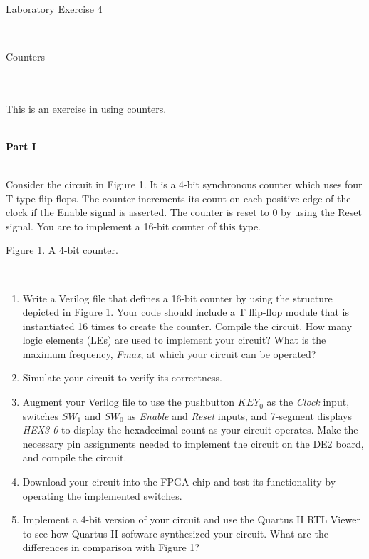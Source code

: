 \documentclass[psfig,10pt,fullpage]{article}
\begin{document}
~\\
\centerline{\huge Laboratory Exercise 4}
~\\
\centerline{\large Counters}
~\\
~\\

This is an exercise in using counters.

~\\
\noindent
{\bf Part I}

~\\
\noindent
Consider the circuit in Figure 1. It is a 4-bit synchronous counter which uses four
T-type flip-flops. The counter increments its count on each positive edge of the clock
if the Enable signal is asserted. The counter is reset to 0 by using the Reset signal.
You are to implement a 16-bit counter of this type.
~\\

\begin{figure}[H]
\scriptsize
\centerline{
\hbox{}}
\end{figure}
\centerline{Figure 1.  A 4-bit counter.}
~\\

\begin{enumerate}
\item Write a Verilog file that defines a 16-bit counter by using the structure
depicted in Figure 1. Your code should include a T flip-flop module that is instantiated
16 times to create the counter. Compile the circuit. How many logic elements (LEs) are 
used to implement your circuit? What is the maximum frequency, {\it Fmax}, at which
your circuit can be operated?
\item Simulate your circuit to verify its correctness.
\item Augment your Verilog file to use the pushbutton $KEY_0$ as the {\it Clock}
input, switches $SW_1$ and $SW_0$ as {\it Enable} and {\it Reset} inputs, and
7-segment displays {\it HEX3-0} to display the hexadecimal count as your circuit
operates. Make the necessary pin assignments needed to implement the circuit on the DE2
board, and compile the circuit.
\item Download your circuit into the FPGA chip and test its functionality by operating
the implemented switches.
\item Implement a 4-bit version of your circuit and use the Quartus II RTL Viewer to
see how Quartus II software synthesized your circuit. What are the differences in
comparison with Figure 1?
\end{enumerate}
\end{document}
